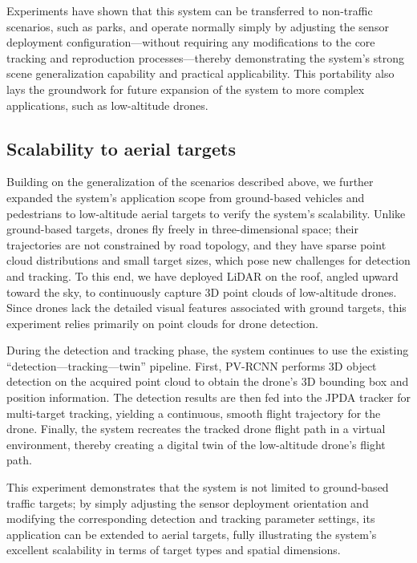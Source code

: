\documentclass[lineno,pdflatex,sn-basic]{sn-jnl}%
\theoremstyle{thmstyleone}%
\theoremstyle{thmstyletwo}%
\theoremstyle{thmstylethree}%
\begin{document}

Experiments have shown that this system can be transferred to non-traffic scenarios, such as parks, and operate normally simply by adjusting the sensor deployment configuration—without requiring any modifications to the core tracking and reproduction processes—thereby demonstrating the system’s strong scene generalization capability and practical applicability.
This portability also lays the groundwork for future expansion of the system to more complex applications, such as low-altitude drones.


\subsection{Scalability to aerial targets}
Building on the generalization of the scenarios described above, we further expanded the system’s application scope from ground-based vehicles and pedestrians to low-altitude aerial targets to verify the system’s scalability.
Unlike ground-based targets, drones fly freely in three-dimensional space; their trajectories are not constrained by road topology, and they have sparse point cloud distributions and small target sizes, which pose new challenges for detection and tracking.
To this end, we have deployed LiDAR on the roof, angled upward toward the sky, to continuously capture 3D point clouds of low-altitude drones.
Since drones lack the detailed visual features associated with ground targets, this experiment relies primarily on point clouds for drone detection.

During the detection and tracking phase, the system continues to use the existing “detection—tracking—twin” pipeline.
First, PV-RCNN performs 3D object detection on the acquired point cloud to obtain the drone’s 3D bounding box and position information.
The detection results are then fed into the JPDA tracker for multi-target tracking, yielding a continuous, smooth flight trajectory for the drone.
Finally, the system recreates the tracked drone flight path in a virtual environment, thereby creating a digital twin of the low-altitude drone's flight path.


This experiment demonstrates that the system is not limited to ground-based traffic targets; by simply adjusting the sensor deployment orientation and modifying the corresponding detection and tracking parameter settings, its application can be extended to aerial targets, fully illustrating the system’s excellent scalability in terms of target types and spatial dimensions.
\end{document}

